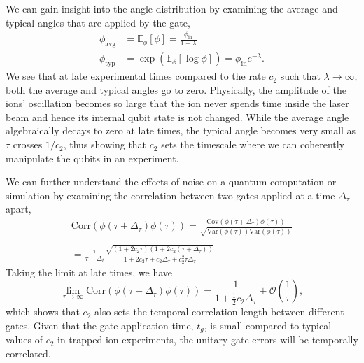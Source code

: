 \documentclass[prx,aps,twocolumn,showpacs,superscriptaddress,10pt]{revtex4-1}
\begin{document}
We can gain insight into the angle distribution by examining the average and typical angles that are applied by the gate,
\begin{align}
	\phi_\textrm{avg}&=\mathbb{E}_{\phi}\left[\phi\right]=\frac{\phi_\textrm{in}}{1+\lambda}\label{eq:avgAngle}\\
	\phi_\textrm{typ}&=\exp{\left(\mathbb{E}_{\phi}\left[\log\phi\right]\right)}=\phi_\textrm{in}e^{-\lambda}.
\end{align}
We see that at late experimental times compared to the rate $c_{2}$ such that $\lambda\rightarrow\infty$, both the average and typical angles go to zero. Physically, the amplitude of the ions' oscillation becomes so large that the ion never spends time inside the laser beam and hence its internal qubit state is not changed. While the average angle algebraically decays to zero at late times, the typical angle becomes very small as $\tau$ crosses $1/c_{2}$, thus showing that $c_{2}$ sets the timescale where we can coherently manipulate the qubits in an experiment.

We can further understand the effects of noise on a quantum computation or simulation by examining the correlation between two gates applied at a time $\Delta_{\tau}$ apart,
\begin{multline}\label{eq:angleCorr}
	\textrm{Corr}\left(\phi(\tau+\Delta_{\tau})\phi(\tau)\right)=\frac{\textrm{Cov}\left(\phi(\tau+\Delta_{\tau})\phi(\tau)\right)}{\sqrt{\textrm{Var}\left(\phi(\tau)\right)\textrm{Var}\left(\phi(\tau)\right)}}\\\\
	=\frac{\tau}{\tau+\Delta_{t}}\frac{\sqrt{\left(1+2c_{2}\tau\right)\left(1+2c_{2}(\tau+\Delta_{\tau})\right)}}{1+2c_{2}\tau+c_{2}\Delta_{\tau}+c_{2}^{2}\tau\Delta_{\tau}}
\end{multline}
Taking the limit at late times, we have
\begin{equation}\label{eq:angleCorrLateTimes}
	\lim\limits_{\tau\rightarrow\infty}\textrm{Corr}\left(\phi(\tau+\Delta_{\tau})\phi(\tau)\right)=\frac{1}{1+\frac{1}{2}c_{2}\Delta_{\tau}}+\mathcal{O}\left(\frac{1}{\tau}\right),
\end{equation}
which shows that $c_{2}$ also sets the temporal correlation length between different gates. Given that the gate application time, $t_{g}$, is small compared to typical values of $c_{2}$ in trapped ion experiments, the unitary gate errors will be temporally correlated.
\end{document}

